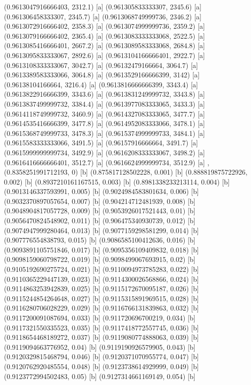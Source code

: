 {{{(0.9613047916666403, 2312.1) [a] 
(0.961305833333307, 2345.6) [a] 
(0.961306458333307, 2345.7) [a] 
(0.9613068749999736, 2346.2) [a] 
(0.9613072916666402, 2358.3) [a] 
(0.9613074999999736, 2359.2) [a] 
(0.9613079166666402, 2365.4) [a] 
(0.9613083333333068, 2522.5) [a] 
(0.9613085416666401, 2667.2) [a] 
(0.9613089583333068, 2684.8) [a] 
(0.9613095833333067, 2892.6) [a] 
(0.9613104166666401, 2922.7) [a] 
(0.9613108333333067, 3042.7) [a] 
(0.96132479166664, 3064.7) [a] 
(0.9613389583333066, 3064.8) [a] 
(0.9613529166666399, 3142) [a] 
(0.96138104166664, 3216.4) [a] 
(0.9613816666666399, 3343.4) [a] 
(0.9613822916666399, 3343.6) [a] 
(0.9613831249999732, 3343.8) [a] 
(0.9613837499999732, 3384.4) [a] 
(0.9613977083333065, 3433.3) [a] 
(0.9614118749999732, 3460.9) [a] 
(0.9614327083333065, 3477.7) [a] 
(0.9614535416666399, 3477.8) [a] 
(0.9614952083333066, 3478.1) [a] 
(0.9615368749999733, 3478.3) [a] 
(0.9615374999999733, 3484.1) [a] 
(0.9615583333333066, 3491.5) [a] 
(0.96157916666664, 3491.7) [a] 
(0.9615999999999734, 3492.9) [a] 
(0.9616208333333067, 3498.2) [a] 
(0.9616416666666401, 3512.7) [a] 
(0.9616624999999734, 3512.9) [a] 
},{(0.8358251991712193, 0) [b] 
(0.875817128502228, 0.001) [b] 
(0.888819875722926, 0.002) [b] 
(0.8937210161167515, 0.003) [b] 
(0.8981338233213114, 0.004) [b] 
(0.9013146337593991, 0.005) [b] 
(0.9024984583801634, 0.006) [b] 
(0.9032370897057654, 0.007) [b] 
(0.904214712481939, 0.008) [b] 
(0.9048904817057728, 0.009) [b] 
(0.9053926017521443, 0.01) [b] 
(0.9056470824548902, 0.011) [b] 
(0.906475340930739, 0.012) [b] 
(0.9074947999280464, 0.013) [b] 
(0.9077159298581299, 0.014) [b] 
(0.907776554838793, 0.015) [b] 
(0.9086585100412636, 0.016) [b] 
(0.9093891105751846, 0.017) [b] 
(0.9095356109409832, 0.018) [b] 
(0.9098159060798722, 0.019) [b] 
(0.9098499067693915, 0.02) [b] 
(0.9105192690275724, 0.021) [b] 
(0.9110094973785283, 0.022) [b] 
(0.9110365229447139, 0.023) [b] 
(0.9114300026568866, 0.024) [b] 
(0.9114863253942839, 0.025) [b] 
(0.9115172670095187, 0.026) [b] 
(0.9115244854264648, 0.027) [b] 
(0.9115315891969515, 0.028) [b] 
(0.9116280706028229, 0.029) [b] 
(0.9116766131839863, 0.032) [b] 
(0.9117200091087694, 0.033) [b] 
(0.911720696700219, 0.034) [b] 
(0.9117321550335523, 0.035) [b] 
(0.9117418772557745, 0.036) [b] 
(0.9118654468189272, 0.037) [b] 
(0.9119080774888063, 0.039) [b] 
(0.9119094663776952, 0.04) [b] 
(0.9119190926579905, 0.043) [b] 
(0.9120329815468794, 0.046) [b] 
(0.9120371070955774, 0.047) [b] 
(0.9120762920485554, 0.048) [b] 
(0.9123738614929999, 0.049) [b] 
(0.9123772994502483, 0.05) [b] 
(0.9127314661169149, 0.054) [b] 
}}}
